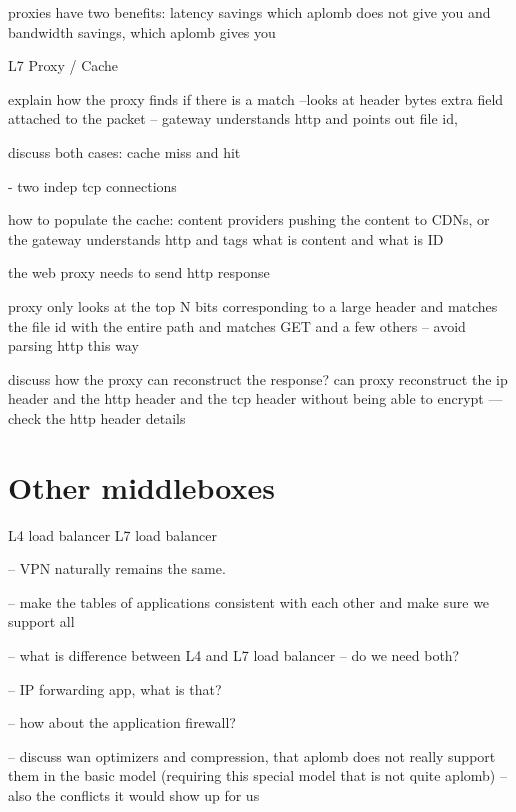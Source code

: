 proxies have two benefits: latency savings which aplomb does not give you 
and bandwidth savings, which aplomb gives you
 
L7 Proxy / Cache

explain how the proxy finds if there is  a match --looks at header bytes
extra field attached to the packet -- gateway understands http and points out file id, 

discuss both cases: cache miss and hit

- two indep tcp connections 

how to populate the cache: content providers pushing the content to CDNs, or the gateway understands
http and tags what is content and what is ID

the web proxy needs to send http response 

proxy only looks at the top N bits corresponding to a large header and matches the file id with the entire path
and matches GET and a few others -- avoid parsing http this way


discuss how the proxy can reconstruct the response?
can proxy reconstruct the ip header and the http header  and the tcp header without being able to encrypt
--- check the http header details


\section{Other middleboxes}\label{sec:vpn} \label{sec:other_apps} \label{sec:not_supp}\label{sec:loadb}


L4 load balancer
L7 load balancer

-- VPN naturally remains the same. 

-- make the tables of applications consistent with each other and make sure we support all 

-- what is difference between L4 and L7 load balancer -- do we need both?

-- IP forwarding app, what is that?

-- how about the application firewall?

-- discuss wan optimizers and compression, that aplomb does not really support them in the basic model (requiring this special model that is not quite aplomb) -- also the conflicts it would show up for us
